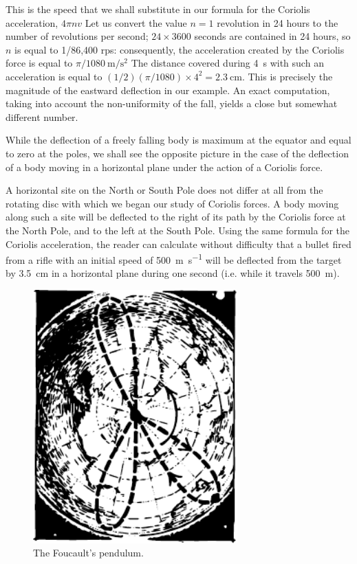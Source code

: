 This is the speed that we shall substitute in our formula
for the Coriolis acceleration, $4 \pi n v$ Let us convert the
value $n = 1$ revolution in 24 hours to the number of
revolutions per second; $24 \times 3600$ seconds are contained
in 24 hours, so $n$ is equal to 1/86,400 rps: consequently,
the acceleration created by the Coriolis force is equal to
$\pi/\SI{1080}{\meter\per\second\squared}$ The distance covered during \SI{4}{\second} with such an acceleration is equal to $(1/2) (\pi/1080) \times 4^{2} = \SI{2.3}{\centi\meter}$. This is precisely the magnitude of the eastward deflection in our example. An exact computation, taking into
account the non-uniformity of the fall, yields a close but
somewhat different number.

While the deflection of a freely falling body is maximum at the equator and equal to zero at the poles, we shall see the opposite picture in the case of the deflection of a body moving in a horizontal plane under the action of a Coriolis force.

A horizontal site on the North or South Pole does not
differ at all from the rotating disc with which we began
our study of Coriolis forces. A body moving along such a
site will be deflected to the right of its path by the Coriolis
force at the North Pole, and to the left at the South Pole.
Using the same formula for the Coriolis acceleration, the
reader can calculate without difficulty that a bullet fired
from a rifle with an initial speed of \SI{500}{\meter\per\second} will be deflected from the target by \SI{3.5}{\centi\meter} in a horizontal plane during one second (i.e. while it travels \SI{500}{\meter}).
\begin{figure}[!ht]
\centering
\includegraphics[width=0.7\textwidth]{figures/fig-02-15.pdf}
\caption{The Foucault's pendulum.}
\label{fig-2.15}
\end{figure}

